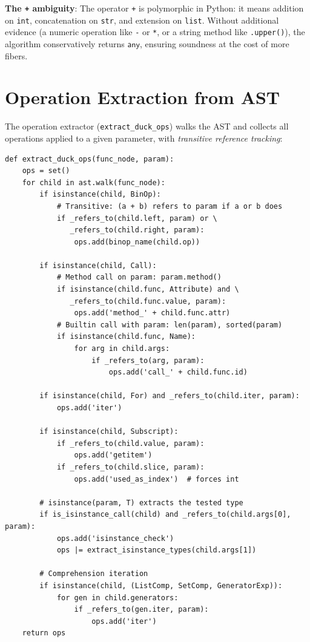 \documentclass[11pt,a4paper]{report}
\theoremstyle{definition}
\theoremstyle{plain}
\begin{document}
\textbf{The \texttt{+} ambiguity}: The operator \texttt{+} is
polymorphic in Python: it means addition on \texttt{int}, concatenation
on \texttt{str}, and extension on \texttt{list}.  Without additional
evidence (a numeric operation like \texttt{-} or \texttt{*}, or a
string method like \texttt{.upper()}), the algorithm conservatively
returns $\mathsf{any}$, ensuring soundness at the cost of more fibers.

\section{Operation Extraction from AST}

The operation extractor (\texttt{extract\_duck\_ops}) walks the
AST and collects all operations applied to a given parameter, with
\emph{transitive reference tracking}:

\begin{lstlisting}[caption={Operation extraction with transitive references}]
def extract_duck_ops(func_node, param):
    ops = set()
    for child in ast.walk(func_node):
        if isinstance(child, BinOp):
            # Transitive: (a + b) refers to param if a or b does
            if _refers_to(child.left, param) or \
               _refers_to(child.right, param):
                ops.add(binop_name(child.op))

        if isinstance(child, Call):
            # Method call on param: param.method()
            if isinstance(child.func, Attribute) and \
               _refers_to(child.func.value, param):
                ops.add('method_' + child.func.attr)
            # Builtin call with param: len(param), sorted(param)
            if isinstance(child.func, Name):
                for arg in child.args:
                    if _refers_to(arg, param):
                        ops.add('call_' + child.func.id)

        if isinstance(child, For) and _refers_to(child.iter, param):
            ops.add('iter')

        if isinstance(child, Subscript):
            if _refers_to(child.value, param):
                ops.add('getitem')
            if _refers_to(child.slice, param):
                ops.add('used_as_index')  # forces int

        # isinstance(param, T) extracts the tested type
        if is_isinstance_call(child) and _refers_to(child.args[0], param):
            ops.add('isinstance_check')
            ops |= extract_isinstance_types(child.args[1])

        # Comprehension iteration
        if isinstance(child, (ListComp, SetComp, GeneratorExp)):
            for gen in child.generators:
                if _refers_to(gen.iter, param):
                    ops.add('iter')
    return ops
\end{lstlisting}
\end{document}
